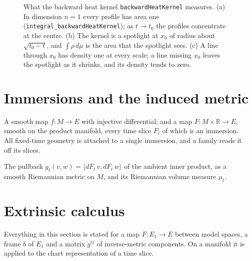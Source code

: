 \begin{figure}[htbp]
\centering
{}
\caption{What the backward heat kernel \texttt{backwardHeatKernel} measures. (a) In
dimension $n = 1$ every profile has area one (\texttt{integral\_backwardHeatKernel}); as
$t \to t_0$ the profiles concentrate at the centre. (b) The kernel is a spotlight at $x_0$ of
radius about $\sqrt{t_0 - t}$, and $\int \rho\,d\mu$ is the area that the spotlight sees.
(c) A line through $x_0$ has density one at every scale; a line missing $x_0$ leaves the
spotlight as it shrinks, and its density tends to zero.}
\label{fig:kernel}
\end{figure}

\section{Immersions and the induced metric}

\begin{definition}
  \label{def:smooth-immersion-family}
  \leanok
  A smooth map $f \colon M \to E$ with injective differential; and a map
  $F \colon M \times \mathbb{R} \to E$, smooth on the product manifold, every time slice
  $F_t$ of which is an immersion. All fixed-time geometry is attached to a single immersion,
  and a family reads it off its slices.
\end{definition}

\begin{definition}
  \label{def:induced-metric}
  \leanok
  The pullback $g_t(v, w) = \langle dF_t\,v, dF_t\,w\rangle$ of the ambient inner
  product, as a smooth Riemannian metric on $M$, and its Riemannian volume measure
  $\mu_t$.
\end{definition}

\section{Extrinsic calculus}

Everything in this section is stated for a map $F \colon E_1 \to E$ between model spaces,
a frame $b$ of $E_1$ and a matrix $g^{ij}$ of inverse-metric components. On a manifold it
is applied to the chart representation of a time slice.

